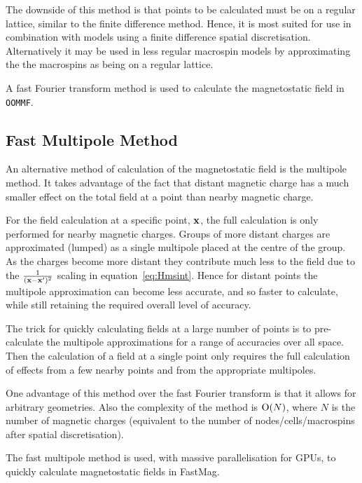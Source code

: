 The downside of this method is that points to be calculated must be on a regular lattice, similar to the finite difference method. Hence, it is most suited for use in combination with models using a finite difference spatial discretisation. Alternatively it may be used in less regular macrospin models by approximating the the macrospins as being on a regular lattice.\cite{Jones1997}

A fast Fourier transform method is used to calculate the magnetostatic field in \texttt{OOMMF}.\cite{oommf-website}

\subsection{Fast Multipole Method}
\label{sec:fast-mult-meth}

An alternative method of calculation of the magnetostatic field is the multipole method. It takes advantage of the fact that distant magnetic charge has a much smaller effect on the total field at a point than nearby magnetic charge.

For the field calculation at a specific point, $\mathbf{x}$, the full calculation is only performed for nearby magnetic charges. Groups of more distant charges are approximated (lumped) as a single multipole placed at the centre of the group. As the charges become more distant they contribute much less to the field due to the $\frac{1}{(\mathbf{x} - \mathbf{x}')^2}$ scaling in equation~\eqref{eq:Hmsint}. Hence for distant points the multipole approximation can become less accurate, and so faster to calculate, while still retaining the required overall level of accuracy.

The trick for quickly calculating fields at a large number of points is to pre-calculate the multipole approximations for a range of accuracies over all space. Then the calculation of a field at a single point only requires the full calculation of effects from a few nearby points and from the appropriate multipoles.\cite{Beatson}

One advantage of this method over the fast Fourier transform is that it allows for arbitrary geometries. Also the complexity of the method is $\text{O}(N)$, where $N$ is the number of magnetic charges (equivalent to the number of nodes/cells/macrospins after spatial discretisation).\cite{Chang2011}

The fast multipole method is used, with massive parallelisation for GPUs, to quickly calculate magnetostatic fields in FastMag.\cite{Chang2011} %

